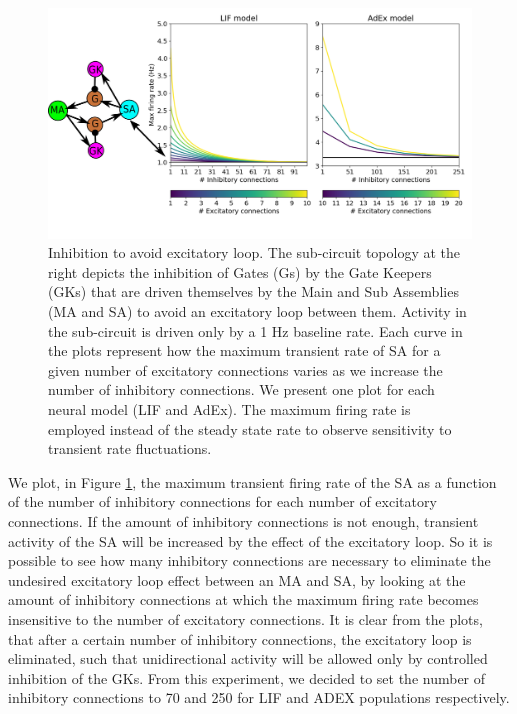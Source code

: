 \documentclass[10pt]{article}
\begin{document}
\begin{figure}[h!]
  \begin{center}
    \includegraphics[width=1.0\columnwidth]{figures/experiment_4}
    \caption{Inhibition to avoid excitatory loop.
The sub-circuit topology at the right depicts the inhibition of Gates (Gs) by the Gate Keepers (GKs) that are driven themselves by the Main and Sub Assemblies (MA and SA) to avoid an excitatory loop between them.
Activity in the sub-circuit is driven only by a 1 Hz baseline rate.
Each curve in the plots represent how the maximum transient rate of SA for a given number of excitatory connections varies as we increase the number of inhibitory connections.
We present one plot for each neural model (LIF and AdEx).
The maximum firing rate is employed instead of the steady state rate to observe sensitivity to transient rate fluctuations.
}
    \label{fig:experiment-4}
  \end{center}
\end{figure}


We plot, in Figure \ref{fig:experiment-4}, the maximum transient firing rate of the SA as a function of the number of inhibitory connections for each number of excitatory connections.
If the amount of inhibitory connections is not enough, transient activity of the SA will be increased by the effect of the excitatory loop.
So it is possible to see how many inhibitory connections are necessary to eliminate the undesired excitatory loop effect between an MA and SA, by looking at the amount of inhibitory connections at which the maximum firing rate becomes insensitive to the number of excitatory connections.
It is clear from the plots, that after a certain number of inhibitory connections, the excitatory loop is eliminated, such that unidirectional activity will be allowed only by controlled inhibition of the GKs.
From this experiment, we decided to set the number of inhibitory connections to 70 and 250 for LIF and ADEX populations respectively.
\end{document}
